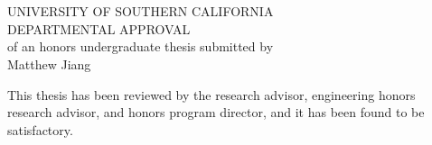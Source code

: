 \chapter*{}

\begin{center}
UNIVERSITY OF SOUTHERN CALIFORNIA\\
\vspace{1.5cm}
DEPARTMENTAL APPROVAL\\
\vspace{2cm}
of an honors undergraduate thesis submitted by\\
Matthew Jiang\\
\vspace{1cm}
\end{center}
This thesis has been reviewed by the research advisor, engineering honors research advisor, and honors program director, and it has been found to be satisfactory.\\
\vspace{1cm}

\noindent{}